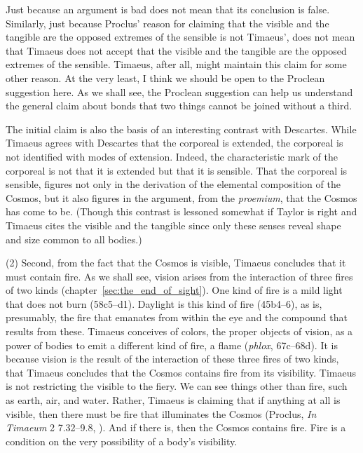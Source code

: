 Just because an argument is bad does not mean that its conclusion is false. Similarly, just because Proclus' reason for claiming that the visible and the tangible are the opposed extremes of the sensible is not Timaeus', does not mean that Timaeus does not accept that the visible and the tangible are the opposed extremes of the sensible. Timaeus, after all, might maintain this claim for some other reason. At the very least, I think we should be open to the Proclean suggestion here. As we shall see, the Proclean suggestion can help us understand the general claim about bonds that two things cannot be joined without a third.

The initial claim is also the basis of an interesting contrast with Descartes. While Timaeus agrees with Descartes that the corporeal is extended, the corporeal is not identified with modes of extension. Indeed, the characteristic mark of the corporeal is not that it is extended but that it is sensible. That the corporeal is sensible, figures not only in the derivation of the elemental composition of the Cosmos, but it also figures in the argument, from the \emph{proemium}, that the Cosmos has come to be. (Though this contrast is lessoned somewhat if Taylor is right and Timaeus cites the visible and the tangible since only these senses reveal shape and size common to all bodies.)

(2) Second, from the fact that the Cosmos is visible, Timaeus concludes that it must contain fire. As we shall see, vision arises from the interaction of three fires of two kinds (chapter~\ref{sec:the_end_of_sight}). One kind of fire is a mild light that does not burn (58c5–d1). Daylight is this kind of fire (45b4–6), as is, presumably, the fire that emanates from within the eye and the compound that results from these. Timaeus conceives of colors, the proper objects of vision, as a power of bodies to emit a different kind of fire, a flame (\emph{phlox}, 67c–68d). It is because vision is the result of the interaction of these three fires of two kinds, that Timaeus concludes that the Cosmos contains fire from its visibility. Timaeus is not restricting the visible to the fiery. We can see things other than fire, such as earth, air, and water. Rather, Timaeus is claiming that if anything at all is visible, then there must be fire that illuminates the Cosmos (Proclus, \emph{In Timaeum} 2 7.32--9.8, \citealt{Diehl:1903re}). And if there is, then the Cosmos contains fire. Fire is a condition on the very possibility of a body's visibility.

